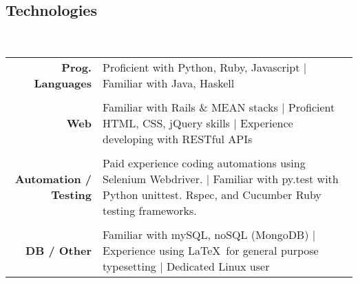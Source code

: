 \documentclass[11pt,line,centered]{res}
\begin{document}
\begin{resume}
    \section{\sectionfont\normalsize Technologies}\\
    \vspace{1em}
    \begin{tabulary}{\linewidth}{RJ}
        \bfseries{Prog. Languages} & Proficient with Python, Ruby, Javascript | Familiar with Java, Haskell \\
        \\
        \bfseries{Web} & Familiar with Rails \& MEAN stacks | Proficient HTML, CSS, jQuery skills | Experience developing with RESTful APIs\\
        \\
        \bfseries{Automation / Testing} &  Paid experience coding automations using Selenium Webdriver. | Familiar with py.test with Python unittest. Rspec, and Cucumber Ruby testing frameworks.\\
        \\
        \bfseries{DB / Other} & Familiar with mySQL, noSQL (MongoDB) | Experience using \LaTeX\ for general purpose typesetting | Dedicated Linux user\\
    \end{tabulary}

\end{resume}
\end{document}
